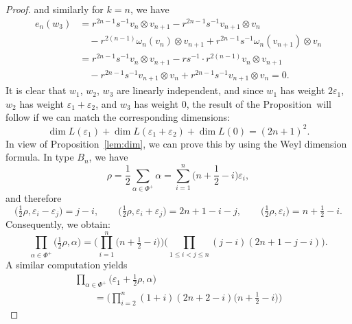 \documentclass[10pt,a4paper]{amsart}
\numberwithin{equation}{section}
\begin{document}
\begin{proof}
and similarly for $k = n$, we have
\begin{displaymath}
\begin{split}
 e_{n}(w_{3}) &=
 r^{2n-1}s^{-1} v_{n} \otimes v_{n+1} - r^{2n-1}s^{-1} v_{n+1} \otimes v_{n}
 \\
 &\quad- r^{2(n-1)} \omega_n(v_{n}) \otimes v_{n+1} + r^{2n-1}s^{-1} \omega_n(v_{n+1}) \otimes v_{n} \\
 &= r^{2n - 1}s^{-1}v_{n} \otimes v_{n+1}- rs^{-1}\cdot r^{2(n-1)}v_{n} \otimes v_{n+1} \\
 &\quad - r^{2n - 1}s^{-1}v_{n+1} \otimes v_{n} + r^{2n - 1}s^{-1}v_{n+1} \otimes v_{n} = 0.
\end{split}
\end{displaymath}
It is clear that $w_{1}$, $w_{2}$, $w_{3}$ are linearly independent, and since $w_{1}$ has weight $2\varepsilon_{1}$, $w_{2}$ has weight ${\varepsilon_{1} + \varepsilon_{2}}$, and $w_{3}$ has weight $0$, the result of the Proposition~will follow if we can match the corresponding dimensions:
\begin{equation}\label{eq:dim-sum}
 \dim{L(\varepsilon_{1})} + \dim{L(\varepsilon_{1} + \varepsilon_{2})} + \dim{L(0)} = (2n + 1)^{2}.
\end{equation}
In view of Proposition~\ref{lem:dim}, we can prove this by using the Weyl dimension formula. In type $B_{n}$, we have
\begin{displaymath}
 \rho = \frac{1}{2}\sum_{\alpha \in \Phi^{+}} \alpha =
 \sum_{i = 1}^{n}\biggl(n + \frac{1}{2} - i\biggr)\varepsilon_{i},
\end{displaymath}
and therefore
\begin{displaymath}
 \bigl(\tfrac{1}{2}\rho,\varepsilon_{i} - \varepsilon_{j}\bigr) = j - i, \qquad
 \bigl(\tfrac{1}{2}\rho,\varepsilon_{i} + \varepsilon_{j}\bigr) = 2n + 1 - i - j, \qquad
 \bigl(\tfrac{1}{2}\rho,\varepsilon_{i}\bigr) = n + \tfrac{1}{2} - i.
\end{displaymath}
Consequently, we obtain:
\begin{displaymath}
 \prod_{\alpha \in \Phi^{+}}\bigl(\tfrac{1}{2}\rho ,\alpha\bigr) =
 \Biggl( \prod_{i = 1}^{n} \bigl(n + \tfrac{1}{2} - i \bigr) \Biggr)
 \biggl( \prod_{1 \le i < j \le n}(j - i)(2n + 1 - j - i) \biggr).
\end{displaymath}
A similar computation yields
\begin{gather*}
 \prod_{\alpha \in \Phi^{+}}\bigl(\varepsilon_{1} + \tfrac{1}{2}\rho,\alpha\bigr) \\
 \qquad{}=
 \Biggl( \prod_{i = 2}^{n}(1 + i)(2n + 2 - i)\bigl(n + \tfrac{1}{2} - i\bigr)\Biggr)

\end{gather*}
\end{proof}
\end{document}
